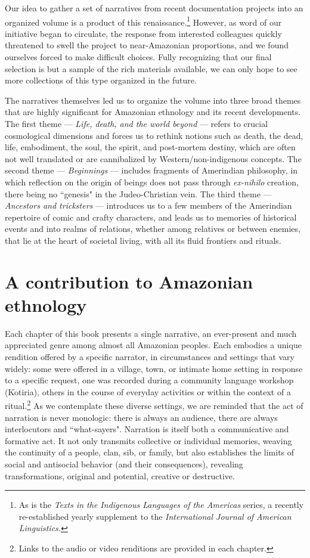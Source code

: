 \documentclass[output=paper,
modfonts,nonflat
]{langsci/langscibook}
\begin{document}
\largerpage
Our idea to gather a set of narratives from recent documentation projects into an organized volume is a product of this renaissance.\footnote{As is the \textit{Texts in the Indigenous Languages of the Americas} series, a recently re-established yearly supplement to the \textit{International Journal of American Linguistics.}} However, as word of our initiative began to circulate, the response from interested colleagues quickly threatened to swell the project to near-Amazonian proportions, and we found ourselves forced to make difficult choices. Fully recognizing that our final selection is but a sample of the rich materials available, we can only hope to see more collections of this type organized in the future.
    
The narratives themselves led us to organize the volume into three broad themes that are highly significant for Amazonian ethnology and its recent developments. The first theme — \textit{Life, death, and the world beyond} — refers to crucial cosmological dimensions and forces us to rethink notions such as death, the dead, life, embodiment, the soul, the spirit, and post-mortem destiny, which are often not well translated or are cannibalized by Western/non-indigenous concepts. The second theme — \textit{Beginnings} — includes fragments of Amerindian philosophy, in which reflection on the origin of beings does not pass through \textit{ex-nihilo} creation, there being no “genesis" in the Judeo-Christian vein. The third theme — \textit{Ancestors and tricksters} — introduces us to a few members of the Amerindian repertoire of comic and crafty characters, and leads us to memories of historical events and into realms of relations, whether among relatives or between enemies, that lie at the heart of societal living, with all its fluid frontiers and rituals.

\newpage
\largerpage
\section{A contribution to Amazonian ethnology}

Each chapter of this book presents a single narrative, an ever-present and much appreciated genre among almost all Amazonian peoples. Each embodies a unique rendition offered by a specific narrator, in circumstances and settings that vary widely: some were offered in a village, town, or intimate home setting in response to a specific request, one was recorded during a community language workshop (Kotiria), others in the course of everyday activities or within the context of a ritual.\footnote{Links to the audio or video renditions are provided in each chapter.} As we contemplate these diverse settings, we are reminded that the act of narration is never monologic: there is always an audience, there are always interlocutors and “what-sayers". Narration is itself both a communicative and formative act. It not only transmits collective or individual memories, weaving the continuity of a people, clan, sib, or family, but also establishes the limits of social and antisocial behavior (and their consequences), revealing transformations, original and potential, creative or destructive.
\end{document}
